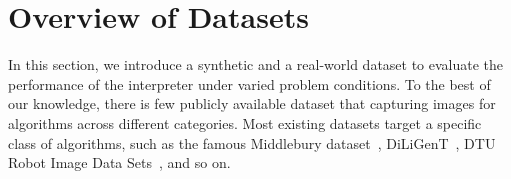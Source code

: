 



\section{Overview of Datasets}
\label{sec:dataset}
In this section, we introduce a synthetic and a real-world dataset to evaluate the performance of the interpreter under varied problem conditions. To the best of our knowledge, there is few publicly available dataset that capturing images for algorithms across different categories. Most existing datasets target a specific class of algorithms, such as the famous Middlebury dataset~\cite{seitz2006comparison}, DiLiGenT~\cite{shi2016benchmark}, DTU Robot Image Data Sets~\cite{jensen2014large}, and so on. 

